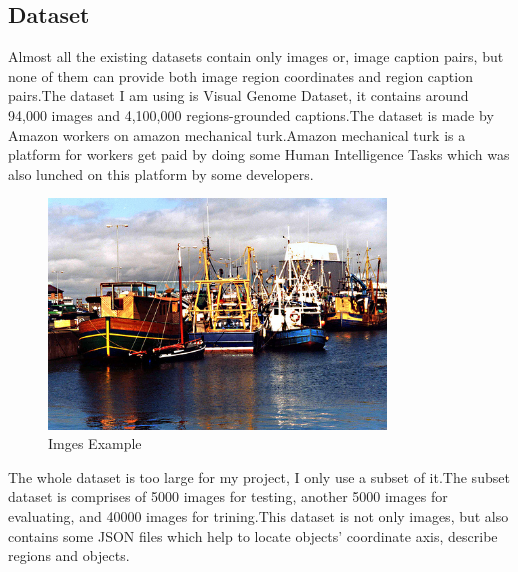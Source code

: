 \documentclass[12pt,a4paper]{report}
\begin{document}
\subsection{Dataset}
Almost all the existing datasets contain only images or, image caption pairs, but none of them can provide both image region coordinates and region caption pairs.The dataset I am using is Visual Genome Dataset, it contains around 94,000 images and 4,100,000 regions-grounded captions.The dataset is made by Amazon workers on amazon mechanical turk.Amazon mechanical turk is a platform for workers get paid by doing some Human Intelligence Tasks which was  also lunched on this platform by some developers.
\begin{figure}[h]
\centering
\includegraphics[width=0.8\textwidth]{2356274.jpg}
\caption{Imges Example}
\end{figure}

The whole dataset is too large for my project, I only use a subset of it.The subset dataset is comprises of  5000 images for testing, another 5000 images for evaluating, and 40000 images for trining.This dataset is not only images, but also contains some JSON files which help to locate objects' coordinate axis, describe regions and objects.
\end{document}
